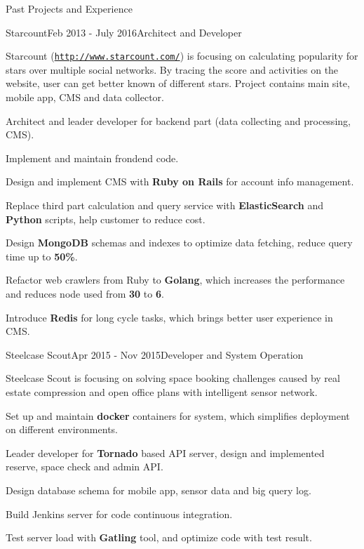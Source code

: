 \documentclass{resume} %
\newcommand{\http}{http:/\hspace{-0.3ex}/}
\begin{document}
\begin{rSection}{Past Projects and Experience}


\begin{rSubsection}{Starcount}{Feb 2013 - July 2016}{Architect and Developer}{}

Starcount (\href{http://www.starcount.com/}{\tt \http{}www.starcount.com/}) is focusing on calculating popularity for stars over multiple social networks. By tracing the score and activities on the website, user can get better known of different stars. Project contains main site, mobile app, CMS and data collector.

\begin{rSubsectionList}
\item Architect and leader developer for backend part (data collecting and processing, CMS).
\item Implement and maintain frondend code.
\item Design and implement CMS with \textbf{Ruby on Rails} for account info management.
\item Replace third part calculation and query service with \textbf{ElasticSearch} and \textbf{Python} scripts, help customer to reduce cost.
\item Design \textbf{MongoDB} schemas and indexes to optimize data fetching, reduce query time up to \textbf{50\%}.
\item Refactor web crawlers from Ruby to \textbf{Golang}, which increases the performance and reduces node used from \textbf{30} to \textbf{6}.
\item Introduce \textbf{Redis} for long cycle tasks, which brings better user experience in CMS.
\end{rSubsectionList}
\end{rSubsection}


\begin{rSubsection}{Steelcase Scout}{Apr 2015 - Nov 2015}{Developer and System Operation}{}

Steelcase Scout is focusing on solving space booking challenges caused by real estate compression and open office plans with intelligent sensor network.

\begin{rSubsectionList}
\item Set up and maintain \textbf{docker} containers for system, which simplifies deployment on different environments.
\item Leader developer for \textbf{Tornado} based API server, design and implemented reserve, space check and admin API.
\item Design database schema for mobile app, sensor data and big query log.
\item Build Jenkins server for code continuous integration.
\item Test server load with \textbf{Gatling} tool, and optimize code with test result.
\end{rSubsectionList}
\end{rSubsection}



\end{rSection}
\end{document}

